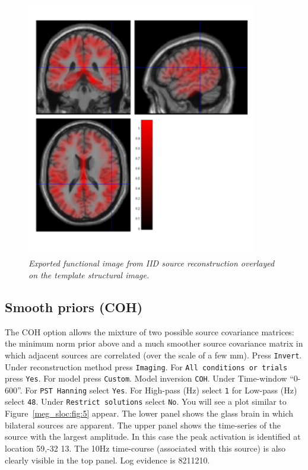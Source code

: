 \begin{figure}
\begin{center}
\includegraphics[width=100mm]{meg_sloc/slide4}
\caption{\em Exported functional image from IID source reconstruction overlayed on the template structural image.\label{meg_sloc:fig:4}}
\end{center}
\end{figure}

\subsection{Smooth priors (COH)}
The COH option allows the mixture of two possible source covariance matrices: the minimum norm prior above and a much smoother source covariance matrix in which adjacent sources are correlated (over the scale of a few mm). Press \texttt{Invert}. Under reconstruction method press \texttt{Imaging}. For \texttt{All conditions or trials} press \texttt{Yes}. For model press \texttt{Custom}. Model inversion \texttt{COH}. Under Time-window ``0-600''. For \texttt{PST Hanning} select \texttt{Yes}. For High-pass (Hz) select \texttt{1} for Low-pass (Hz) select \texttt{48}. Under \texttt{Restrict solutions} select \texttt{No}.   You will see a plot similar to Figure~\ref{meg_sloc:fig:5} appear. The lower panel shows the glass brain in which bilateral sources are apparent. The upper panel shows the time-series of the source with the largest amplitude. In this case the peak activation is identified at location 59,-32 13. The 10Hz time-course (associated with this source) is also clearly visible in the top panel.  Log evidence is 8211210.

